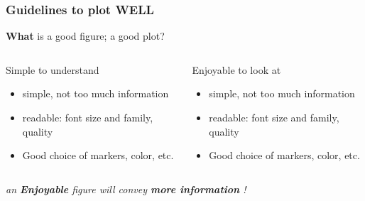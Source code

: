 \documentclass[sans, aspectratio=169]{beamer}
\begin{document}
\begin{frame} 
	\frametitle{Guidelines to plot {\bf WELL}} 
	\begin{center}
	\textbf{What} is a good figure; a good plot?
	\end{center}
	
	\begin{columns}
		\begin{column}{0.5\linewidth}
		\begin{center}
		Simple to understand
		\end{center}
		\begin{itemize}
			\item<2-> simple, not too much information
			\item<2-> readable: font size and family, quality
			\item<2-> Good choice of markers, color, etc.
		\end{itemize}
		\end{column}
		\begin{column}{0.5\linewidth}
		\begin{center}
		Enjoyable to look at
		\end{center}
		\begin{itemize}
			\item<3-> simple, not too much information
			\item<3-> readable: font size and family, quality
			\item<3-> Good choice of markers, color, etc.
		\end{itemize}
		\end{column}
	\end{columns}
	\vspace{0.5cm}	
	\pause \pause \pause
	
	\begin{center}
	{\it an {\bf Enjoyable} figure will convey \textbf{more information} !} 
	\end{center}
\end{frame}
\end{document}
